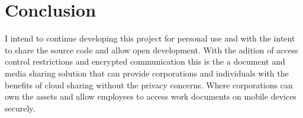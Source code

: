 \documentclass[12pt]{article}
\begin{document}
\section{Conclusion}

I intend to continue developing this project for personal use and with the intent to share the source code and allow open development. With the adition of access control restrictions and encrypted communication this is the a document and media sharing solution that can provide corporations and individuals with the benefits of cloud sharing without the privacy concerns. Where corporations can own the assets and allow employees to access work documents on mobile devices securely.  
\end{document}
